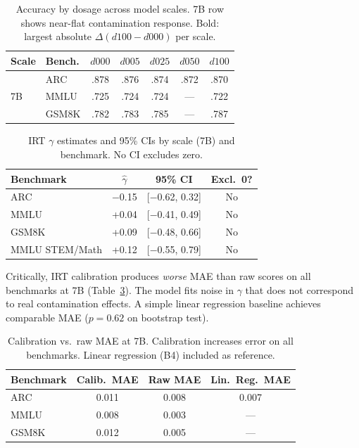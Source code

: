 \documentclass[11pt,a4paper]{article}
\newcommand{\gam}{\gamma}
\begin{document}
\begin{table}[t]
\centering
\small
\caption{Accuracy by dosage across model scales. 7B row shows near-flat contamination response. Bold: largest absolute $\Delta(d100 - d000)$ per scale.}
\label{tab:scale_bridging}
\begin{tabular}{llccccc}
\toprule
\textbf{Scale} & \textbf{Bench.} & $d000$ & $d005$ & $d025$ & $d050$ & $d100$ \\
\midrule
\multirow{3}{*}{7B}
  & ARC   & .878 & .876 & .874 & .872 & .870 \\
  & MMLU  & .725 & .724 & .724 & ---  & .722 \\
  & GSM8K & .782 & .783 & .785 & ---  & .787 \\
\bottomrule
\end{tabular}
\end{table}

\begin{table}[t]
\centering
\small
\caption{IRT $\gam$ estimates and 95\% CIs by scale (7B) and benchmark. No CI excludes zero.}
\label{tab:gamma_forest}
\begin{tabular}{lccc}
\toprule
\textbf{Benchmark} & $\hat{\gam}$ & 95\% CI & Excl.\ 0? \\
\midrule
ARC            & $-$0.15 & [$-$0.62, 0.32] & No \\
MMLU           & +0.04   & [$-$0.41, 0.49] & No \\
GSM8K          & +0.09   & [$-$0.48, 0.66] & No \\
MMLU STEM/Math & +0.12   & [$-$0.55, 0.79] & No \\
\bottomrule
\end{tabular}
\end{table}

Critically, IRT calibration produces \emph{worse} MAE than raw scores on all benchmarks at 7B (Table~\ref{tab:calibration_7b}).
The model fits noise in $\gam$ that does not correspond to real contamination effects.
A simple linear regression baseline achieves comparable MAE ($p = 0.62$ on bootstrap test).

\begin{table}[t]
\centering
\small
\caption{Calibration vs.\ raw MAE at 7B. Calibration increases error on all benchmarks. Linear regression (B4) included as reference.}
\label{tab:calibration_7b}
\begin{tabular}{lccc}
\toprule
\textbf{Benchmark} & Calib.\ MAE & Raw MAE & Lin.\ Reg.\ MAE \\
\midrule
ARC   & 0.011 & 0.008 & 0.007 \\
MMLU  & 0.008 & 0.003 & --- \\
GSM8K & 0.012 & 0.005 & --- \\
\bottomrule
\end{tabular}
\end{table}
\end{document}
